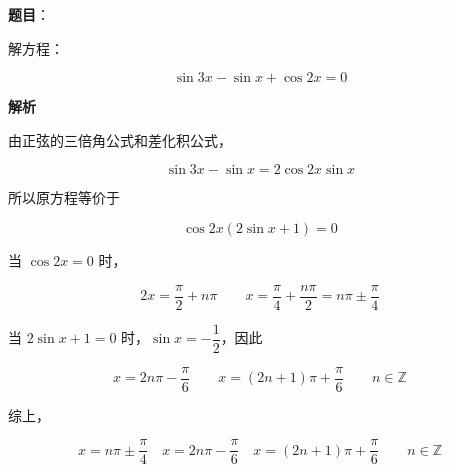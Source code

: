 \begin{answer}

\textbf{题目}：

解方程：

\nopagebreak[4]
\[
\sin3x-\sin x+\cos2x=0
\]

\textbf{解析}

由正弦的三倍角公式和差化积公式，

\nopagebreak[4]
\[
\sin3x-\sin x=2\cos2x\sin x
\]

所以原方程等价于

\nopagebreak[4]
\[
\cos2x(2\sin x+1)=0
\]

当 $\cos2x=0$ 时，

\nopagebreak[4]
\[
2x=\frac\pi2+n\pi
\qquad x=\frac\pi4+\frac{n\pi}{2}=n\pi\pm\frac\pi4
\]

当 $2\sin x+1=0$ 时，$\sin x=-\dfrac12$，因此

\nopagebreak[4]
\[
x=2n\pi-\frac\pi6
\qquad x=(2n+1)\pi+\frac\pi6
\qquad n\in\mathbb Z
\]

综上，

\nopagebreak[4]
\[
x=n\pi\pm\frac\pi4
\quad x=2n\pi-\frac\pi6
\quad x=(2n+1)\pi+\frac\pi6
\qquad n\in\mathbb Z
\]


\end{answer}
